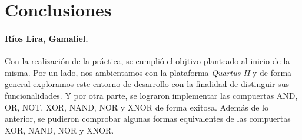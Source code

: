 \documentclass[../main.tex]{subfiles}
\begin{document}
\clearpage
\section{Conclusiones}
\paragraph{Ríos Lira, Gamaliel.} Con la realización de la práctica, se cumplió 
el objtivo planteado al inicio de la misma. Por un lado, nos ambientamos con 
la plataforma \textit{Quartus II} y de forma general exploramos este entorno 
de desarrollo con la finalidad de distinguir sus funcionalidades. Y por otra 
parte, se lograron implementar las compuertas AND, OR, NOT, XOR, NAND, NOR y 
XNOR de forma exitosa. Además de lo anterior, se pudieron comprobar algunas 
formas equivalentes de las compuertas XOR, NAND, NOR y XNOR.
\end{document}
